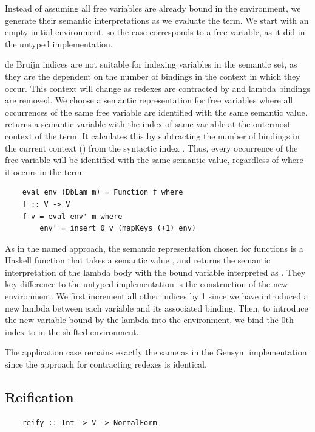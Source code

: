 Instead of assuming all free variables are already bound in the environment, we generate their semantic interpretations as we evaluate the term. We start with an empty initial environment, so the  case corresponds to a free variable, as it did in the untyped implementation. 

de Bruijn indices are not suitable for indexing variables in the semantic set, as they are the dependent on the number of bindings in the context in which they occur. This context will change as redexes are contracted by  and lambda bindings are removed. We choose a semantic representation for free variables where all occurrences of the same free variable are identified with the same semantic value.
 returns a semantic variable with the index of same variable at the outermost context of the term. It calculates this by subtracting the number of bindings in the current context () from the syntactic index . Thus, every occurrence of the free variable will be identified with the same semantic value, regardless of where it occurs in the term. 

\begin{lstlisting}
    eval env (DbLam m) = Function f where
    f :: V -> V
    f v = eval env' m where
        env' = insert 0 v (mapKeys (+1) env)
\end{lstlisting}

As in the named approach, the semantic representation chosen for functions is a Haskell function that takes a semantic value , and returns the semantic interpretation of the lambda body with the bound variable interpreted as . They key difference to the untyped implementation is the construction of the new environment. We first increment all other indices by 1 since we have introduced a new lambda between each variable and its associated binding. Then, to introduce the new variable bound by the lambda into the environment, we bind the 0th index to  in the shifted environment.

The application case remains exactly the same as in the Gensym implementation since the approach for contracting redexes is identical.

\subsection{Reification}

\begin{lstlisting}
    reify :: Int -> V -> NormalForm
\end{lstlisting}


